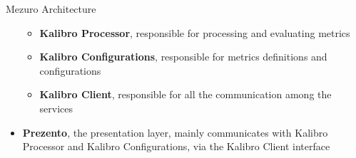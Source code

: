 \begin{block}{Mezuro Architecture}
\begin{itemize}
            \begin{itemize}
                \item \textbf{Kalibro Processor}, responsible for processing and
                    evaluating metrics
                \item \textbf{Kalibro Configurations}, responsible for metrics
                    definitions and configurations
                \item \textbf{Kalibro Client}, responsible for all the communication
                    among the services
            \end{itemize}

        \item \textbf{Prezento}, the presentation layer, mainly communicates with
            Kalibro Processor and Kalibro Configurations, via the Kalibro
            Client interface
    \end{itemize}
\end{block}
